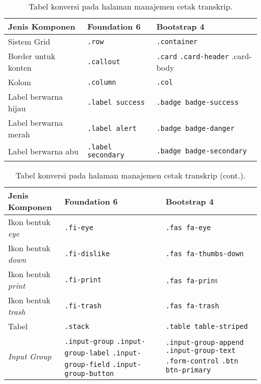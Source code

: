 \begin{table}[H]
	\caption{Tabel konversi pada halaman manajemen cetak transkrip.}
	\begin{tabular}{| p{} | p{} | p{} |} 
		\hline
		\textbf{Jenis Komponen} & \textbf{Foundation 6} & \textbf{Bootstrap 4}  \\ [0.5ex] 
		\hline	
		Sistem Grid & \texttt{.row} &   \texttt{.container} \\ 
		\hline	
		Border untuk konten & \texttt{.callout} &  \texttt{.card} \newline \texttt{.card-header} \newline .card-body \\
		\hline
		Kolom & \texttt{.column} &  \texttt{.col} \\	
		\hline	
		Label berwarna hijau & \texttt{.label success} &  \texttt{.badge badge-success} \\
		\hline	
		Label berwarna merah &\texttt{.label alert} & \texttt{.badge badge-danger}  \\
		\hline	
		Label berwarna abu & \texttt{.label secondary} & \texttt{.badge badge-secondary}  \\
		\hline	
	\end{tabular}
\end{table}

\begin{table}[H] \ContinuedFloat
	\caption{Tabel konversi pada halaman manajemen cetak transkrip (cont.).}
	\begin{tabular}{| p{} | p{} | p{} |} 
		\hline
		\textbf{Jenis Komponen} & \textbf{Foundation 6} & \textbf{Bootstrap 4}  \\ [0.5ex] 
		\hline	
		Ikon bentuk \textit{eye} & \texttt{.fi-eye} &  \texttt{.fas fa-eye} \\	
		\hline	
		Ikon bentuk \textit{down} & \texttt{.fi-dislike} &  \texttt{.fas fa-thumbs-down} \\	
		\hline
		Ikon bentuk \textit{print} & \texttt{.fi-print} &  \texttt{.fas fa-prin}t \\	
		\hline
		Ikon bentuk \textit{trash} & \texttt{.fi-trash} &  \texttt{.fas fa-trash} \\	
		\hline
		Tabel & \texttt{.stack} & \texttt{.table table-striped}  \\
		\hline	
		\textit{Input Group} & \texttt{.input-group} \newline \texttt{.input-group-label} \newline \texttt{.input-group-field} \newline \texttt{.input-group-button} & \texttt{.input-group-append} \newline \texttt{.input-group-text} \newline \texttt{.form-control} \newline \texttt{.btn btn-primary} \\[1ex]
		\hline	
	\end{tabular}
	\label{table:konversiManajemenCetakTranskrip}
\end{table}

